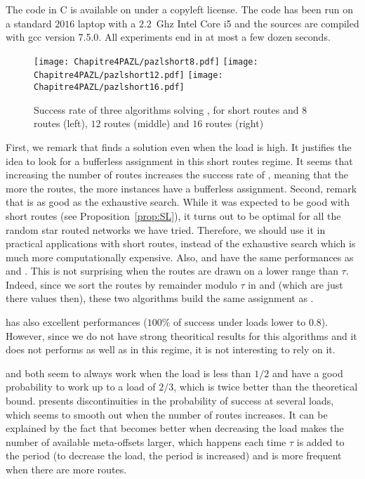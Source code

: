      The code in C is available on \cite{webpage} under a copyleft license. The code has been run on a standard $2016$ laptop with a $2.2$~Ghz Intel Core i5 and the sources are compiled with gcc version 7.5.0. All experiments end in at most a few dozen seconds.



      \begin{figure}[h]
      \begin{center}
   \texttt{[image: Chapitre4PAZL/pazlshort8.pdf]}
   \texttt{[image: Chapitre4PAZL/pazlshort12.pdf]}
   \texttt{[image: Chapitre4PAZL/pazlshort16.pdf]}
      \end{center}
      \caption{Success rate of three algorithms solving \pma, for short routes and $8$ routes (left), $12$ routes (middle) and $16$ routes (right)}\label{fig:short}
      \end{figure}

      First, we remark that \ESCA finds a solution even when the load is high. It justifies the idea to look for a bufferless assignment in this short routes regime. It seems that increasing the number of routes increases the success rate of \ESCA, meaning that the more the routes, the more instances have a bufferless assignment. 
      Second, remark that \shortestlongest is as good as the exhaustive search. While it was expected to be good with short routes (see Proposition~\ref{prop:SL}), it turns out to be optimal for all the random star routed networks we have tried. Therefore, we should use it in practical applications with short routes, instead of the exhaustive search which is much more computationally expensive. 
      Also, \compactpair and \compactfit have the same performances as \ESCA and \shortestlongest. This is not surprising when the routes are drawn on a lower range than $\tau$. Indeed, since we sort the routes by remainder modulo $\tau$  in \compactpair and \compactfit (which are just there values then), these two algorithms build the same assignment as \shortestlongest.

       \firstfit has also excellent performances ($100\%$ of success under loads lower to $0.8$). However, since we do not have strong theoritical results for this algorithms and it does not performs as well as \shortestlongest in this regime, it is not interesting to rely on it.

      \metaoffset and \greedyuniform both seem to always work when the load is less than $1/2$ and have a good probability to work up to a load of $2/3$, which is twice better than the theoretical bound. \metaoffset presents discontinuities in the probability of success at several loads, which seems to smooth out when the number of routes increases. It can be explained by the fact that \metaoffset becomes better when decreasing the load makes the number of available meta-offsets larger, which happens each time $\tau$ is added to the period (to decrease the load, the period is increased) and is more frequent when there are more routes.
      
